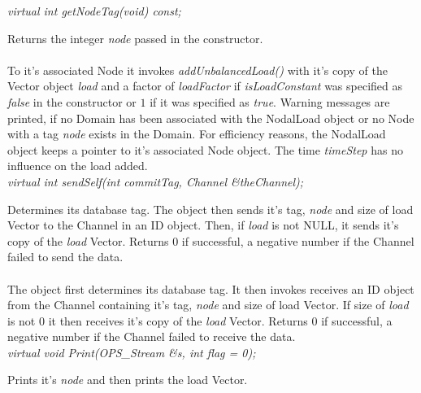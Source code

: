 {\em virtual int getNodeTag(void) const;} 

Returns the integer {\em node} passed in the constructor. \\

 \\
To it's associated Node it invokes {\em addUnbalancedLoad()} with it's
copy of the Vector object {\em load} and a factor of {\em loadFactor}
if {\em isLoadConstant} was specified as {\em false} in the constructor or
$1$ if it was specified as {\em true}. Warning
messages are printed, if no Domain has been associated with the
NodalLoad object or no Node with a tag {\em node} exists in the
Domain. For efficiency reasons, the NodalLoad object keeps a pointer
to it's associated Node object. The time {\em timeStep} has no
influence on the load added. \\

{\em virtual int sendSelf(int commitTag, Channel \&theChannel); } 

Determines its database tag. The object then sends it's tag, {\em
node} and size of load Vector to the Channel in an ID object. Then, if
{\em load} is not NULL, it sends it's copy of the {\em load}
Vector. Returns $0$ if successful, a negative number if the Channel
failed to send the data. \\  

 \\
The object first determines its database tag. It then invokes receives
an ID object from the Channel containing it's tag, {\em node} and size
of load Vector. If size of {\em load} is not $0$ it then receives it's
copy of the {\em load} Vector. Returns $0$ if successful, a negative 
number if the Channel failed to receive the data. \\ 

{\em virtual void Print(OPS_Stream \&s, int flag = 0);} 

Prints it's {\em node} and then prints the load Vector. \\

